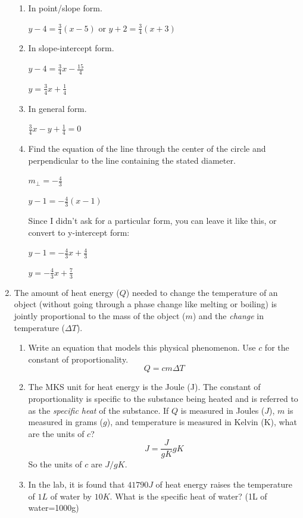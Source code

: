 \documentclass[letterpaper,12pt,fleqn]{article}
\newcommand{\D}{\Delta}
\begin{document}
\begin{enumerate}
\begin{enumerate}
\item{In point/slope form.}

  $y-4=\frac{3}{4}(x-5)$ or $y+2=\frac{3}{4}(x+3)$

\item{In slope-intercept form.}

  $y-4=\frac{3}{4}x-\frac{15}{4}$

  $y=\frac{3}{4}x+\frac{1}{4}$
  
\item{In general form.}

  $\frac{3}{4}x-y+\frac{1}{4}=0$
  
\item{Find the equation of the line through the center of the circle and
  perpendicular to the line containing the stated diameter.}

  $m_{\perp}=-\frac{4}{3}$

  $y-1=-\frac{4}{3}(x-1)$

  Since I didn't ask for a particular form, you can leave it like this, or
  convert to y-intercept form:

  $y-1=-\frac{4}{3}x+\frac{4}{3}$

  $y=-\frac{4}{3}x+\frac{7}{3}$
\end{enumerate}

\item The amount of heat energy ($Q$) needed to change the temperature of an
object (without going through a phase change like melting or boiling) is jointly
proportional to the mass of the object ($m$) and the \emph{change} in
temperature ($\Delta T$).
\begin{enumerate}
\item Write an equation that models this physical phenomenon. Use $c$ for the
  constant of proportionality.
  \[Q=cm\D T\]
  
\item The MKS unit for heat energy is the Joule (J). The constant of
proportionality is specific to the substance being heated and is referred to as
the \emph{specific heat} of the substance. If $Q$ is measured in Joules ($J$),
$m$ is measured in grams ($g$), and temperature is measured in Kelvin (K), what
are the units of $c$?
\[J=\frac{J}{gK}gK\]
So the units of $c$ are $J/gK$.

\item In the lab, it is found that $41790J$ of heat energy raises the
temperature of $1L$ of water by $10K$. What is the specific heat of water?
(1L of water=1000g)


\end{enumerate}
\end{enumerate}
\end{document}
